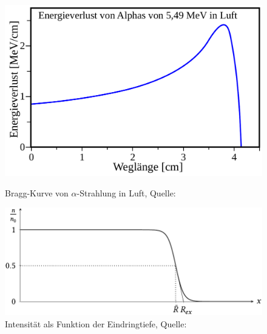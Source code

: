 \documentclass[12pt,a4paper]{scrartcl}
\numberwithin{equation}{section} %
\renewcommand{\[}{} %
\renewcommand{\]}{\noindent} %
\begin{document}
\begin{figure}[h!]
\begin{minipage}{0.45\textwidth}
		\includegraphics[width=\textwidth]{../media/B3.3/Bragg-Kurve.pdf}
		\caption{Bragg-Kurve von $\alpha$-Strahlung in Luft, Quelle: \cite{Alpha Luft}}
		\label{abb:Bragg-Kurve}
	\end{minipage}
	\vspace{1cm}
	
	\begin{minipage}{0.8\textwidth}
		\includegraphics[width=\textwidth]{../media/B3.3/Reichweite.pdf}
		\caption{Intensität als Funktion der Eindringtiefe, Quelle: \cite{Uni}}
		\label{abb:Reichweite}
	\end{minipage}
\end{figure}

\clearpage
\end{document}
